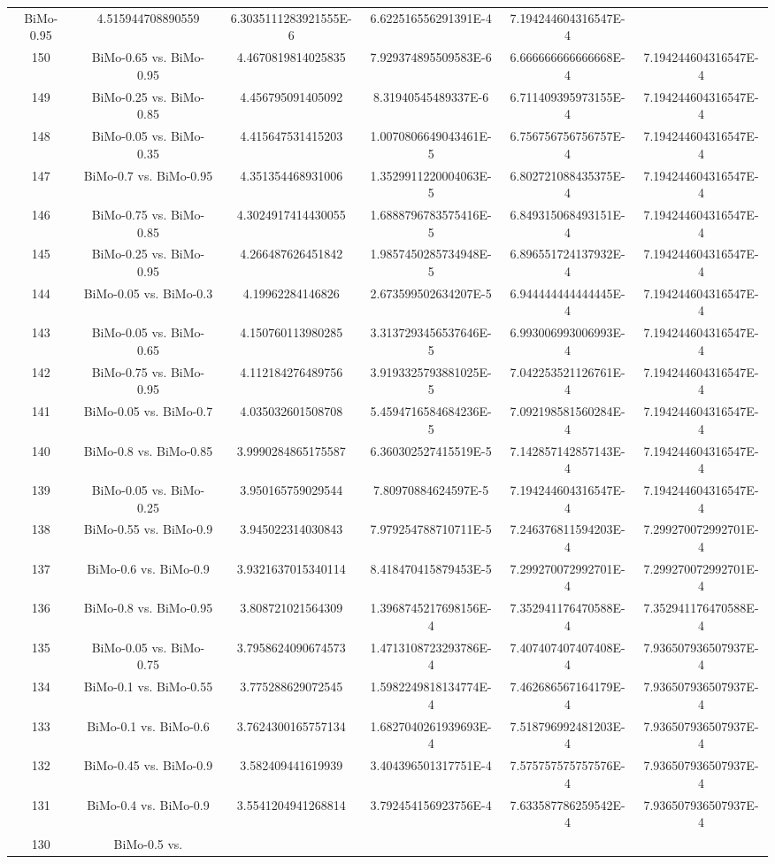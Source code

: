 \documentclass[a4paper,10pt]{article}
\begin{document}
\begin{landscape}
\begin{table}[!htp]
\begin{tabular}{cccccc}
BiMo-0.95&4.515944708890559&6.3035111283921555E-6&6.622516556291391E-4&7.194244604316547E-4\\150&BiMo-0.65 vs. BiMo-0.95&4.4670819814025835&7.929374895509583E-6&6.666666666666668E-4&7.194244604316547E-4\\149&BiMo-0.25 vs. BiMo-0.85&4.456795091405092&8.31940545489337E-6&6.711409395973155E-4&7.194244604316547E-4\\148&BiMo-0.05 vs. BiMo-0.35&4.415647531415203&1.0070806649043461E-5&6.756756756756757E-4&7.194244604316547E-4\\147&BiMo-0.7 vs. BiMo-0.95&4.351354468931006&1.3529911220004063E-5&6.802721088435375E-4&7.194244604316547E-4\\146&BiMo-0.75 vs. BiMo-0.85&4.3024917414430055&1.6888796783575416E-5&6.849315068493151E-4&7.194244604316547E-4\\145&BiMo-0.25 vs. BiMo-0.95&4.266487626451842&1.9857450285734948E-5&6.896551724137932E-4&7.194244604316547E-4\\144&BiMo-0.05 vs. BiMo-0.3&4.19962284146826&2.673599502634207E-5&6.944444444444445E-4&7.194244604316547E-4\\143&BiMo-0.05 vs. BiMo-0.65&4.150760113980285&3.3137293456537646E-5&6.993006993006993E-4&7.194244604316547E-4\\142&BiMo-0.75 vs. BiMo-0.95&4.112184276489756&3.9193325793881025E-5&7.042253521126761E-4&7.194244604316547E-4\\141&BiMo-0.05 vs. BiMo-0.7&4.035032601508708&5.4594716584684236E-5&7.092198581560284E-4&7.194244604316547E-4\\140&BiMo-0.8 vs. BiMo-0.85&3.9990284865175587&6.360302527415519E-5&7.142857142857143E-4&7.194244604316547E-4\\139&BiMo-0.05 vs. BiMo-0.25&3.950165759029544&7.80970884624597E-5&7.194244604316547E-4&7.194244604316547E-4\\138&BiMo-0.55 vs. BiMo-0.9&3.945022314030843&7.979254788710711E-5&7.246376811594203E-4&7.299270072992701E-4\\137&BiMo-0.6 vs. BiMo-0.9&3.9321637015340114&8.418470415879453E-5&7.299270072992701E-4&7.299270072992701E-4\\136&BiMo-0.8 vs. BiMo-0.95&3.808721021564309&1.3968745217698156E-4&7.352941176470588E-4&7.352941176470588E-4\\135&BiMo-0.05 vs. BiMo-0.75&3.7958624090674573&1.4713108723293786E-4&7.407407407407408E-4&7.936507936507937E-4\\134&BiMo-0.1 vs. BiMo-0.55&3.775288629072545&1.5982249818134774E-4&7.462686567164179E-4&7.936507936507937E-4\\133&BiMo-0.1 vs. BiMo-0.6&3.7624300165757134&1.6827040261939693E-4&7.518796992481203E-4&7.936507936507937E-4\\132&BiMo-0.45 vs. BiMo-0.9&3.582409441619939&3.404396501317751E-4&7.575757575757576E-4&7.936507936507937E-4\\131&BiMo-0.4 vs. BiMo-0.9&3.5541204941268814&3.792454156923756E-4&7.633587786259542E-4&7.936507936507937E-4\\130&BiMo-0.5 vs. 
\end{tabular}
\end{table}
\end{landscape}
\end{document}
